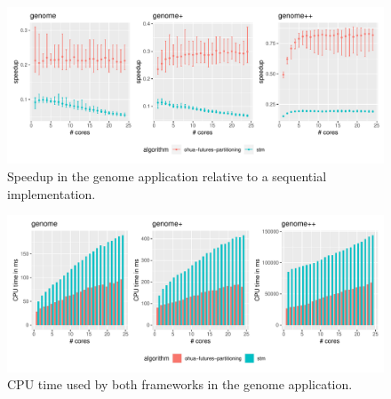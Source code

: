 \begin{figure}
    \centering
    \includegraphics[width=\textwidth,keepaspectratio]{gfx/results/genome_comb}
    \caption{Speedup in the genome application relative to a sequential implementation.}%
    \label{fig:evaluation:genome}
\end{figure}

\begin{figure}
    \centering
    \includegraphics[width=\textwidth,keepaspectratio]{gfx/results/cpu_genome_comb}
    \caption{CPU time used by both frameworks in the genome application.}%
    \label{fig:evaluation:genome-cpu}
\end{figure}


